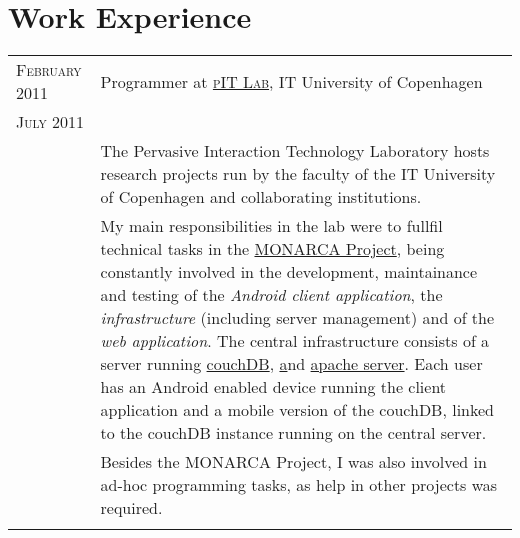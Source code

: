 \documentclass[a4paper,10pt]{article}
\begin{document}
\section{Work Experience}
\begin{tabular}{p{2.5cm}|p{11cm}}

 \raggedleft \textsc{February 2011} & Programmer at
 \textsc{\href{http://www.itu.dk/pit/}{pIT Lab}}, IT University of Copenhagen
 \\\raggedleft \textsc{July 2011}\\& 
 \footnotesize{The Pervasive Interaction Technology Laboratory hosts research
 projects run by the faculty of the IT University of Copenhagen and
 collaborating institutions.}\\

 & \footnotesize{My main responsibilities in the lab were to fullfil technical tasks in the \href{http://www.monarca-project.eu/}{MONARCA Project}, being constantly involved in the  development, maintainance and testing of the \emph{Android client application}, the \emph{infrastructure} (including server management) and of the \emph{web application}. The central infrastructure consists of a server running \href{http://couchdb.apache.org}{couchDB}, \href{http://www.joomla.org} and \href{http://httpd.apache.org}{apache server}. Each user has an Android enabled device running the client application and a mobile version of the couchDB, linked to the couchDB instance running on the central server.}\\

& \footnotesize{Besides the MONARCA Project, I was also involved in ad-hoc programming tasks, as help in other projects was required.}\\\\


\end{tabular}
\end{document}
